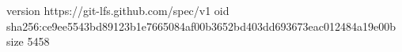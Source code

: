 version https://git-lfs.github.com/spec/v1
oid sha256:ce9ee5543bd89123b1e7665084af00b3652bd403dd693673eac012484a19e00b
size 5458
